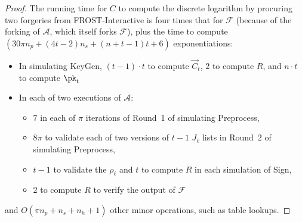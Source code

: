 \begin{proof}
The running time for $C$ to compute the discrete logarithm by procuring two
forgeries from FROST-Interactive is four times that for
$\mathcal{F}$ (because of the forking of $\mathcal{A}$, which itself forks
$\mathcal{F}$), plus
the time to compute $(30\pi n_p + (4t-2)n_s + (n+t-1)t + 6)$ exponentiations:
\begin{itemize}
\setlength\itemsep{0ex}
\item In simulating KeyGen,
$(t-1)\cdot t$ to compute $\vec{C}_t$, $2$ to compute $R$, and $n\cdot t$ to compute $\pk_t$
\item In each of two executions of $\mathcal{A}$:
\begin{itemize}
\setlength\itemsep{0ex}
\item $7$
in each of $\pi$ iterations of Round~1 of simulating Preprocess,
\item 8$\pi$ to validate each of two versions of $t-1$ $J_\ell$ lists in Round~2 of simulating Preprocess,
\item $t-1$ to validate the $\rho_\ell$ and $t$ to compute $R$ in each simulation of Sign,
\item 2 to compute $R$ to verify the output of $\mathcal{F}$
\end{itemize}
\end{itemize}
and
$O(\pi n_p + n_s + n_h + 1)$ other minor operations, such as table lookups.


\end{proof}

